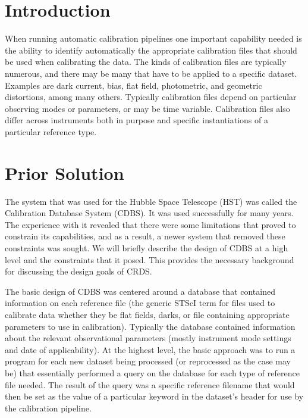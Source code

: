 \documentclass[final,authoryear,5p,times,twocolumn]{elsarticle}
\begin{document}
\newcommand{\aspconf}{ASP Conf.\ Ser}
\newcommand{\aap}{A\&A}
\newcommand{\aaps}{A\&AS}
\newcommand{\jrasc}{JRASC}
\newcommand{\qjras}{QJRAS}
\newcommand{\mnras}{MNRAS}
\newcommand{\pasp}{PASP}
\newcommand{\pasa}{PASA}
\newcommand{\apjs}{ApJS}

\section{Introduction}

When running automatic calibration pipelines one important capability needed is
the ability to identify automatically the appropriate calibration files that
should be used when calibrating the data. The kinds of calibration files are
typically numerous, and there may be many that have to be applied to a specific
dataset. Examples are dark current, bias, flat field, photometric, and
geometric distortions, among many others. Typically calibration files depend on
particular observing modes or parameters, or may be time variable.
Calibration files also differ across instruments both in purpose and specific 
instantiations of a particular reference type.

\section{Prior Solution}

The system that was used for the Hubble Space Telescope (HST) was called the
Calibration Database System (CDBS). It was used successfully for many
years. The experience with it revealed that there were some limitations that
proved to constrain its capabilities, and as a result, a newer system that
removed these constraints was sought. We will briefly describe the design of
CDBS at a high level and the constraints that it posed. This provides the
necessary background for discussing the design goals of CRDS.

The basic design of CDBS was centered around a database that contained
information on each reference file (the generic STScI term for files used to
calibrate data whether they be flat fields, darks, or file containing
appropriate parameters to use in calibration). Typically the database contained
information about the relevant observational parameters (mostly instrument mode
settings and date of applicability). At the highest level, the basic approach
was to run a program for each new dataset being processed (or reprocessed as
the case may be) that essentially performed a query on the database for each
type of reference file needed. The result of the query was a specific reference
filename that would then be set as the value of a particular keyword in the
dataset's header for use by the calibration pipeline.
\end{document}
